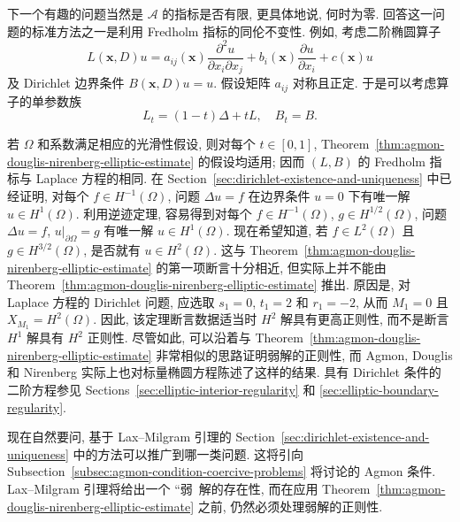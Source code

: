 下一个有趣的问题当然是 $\mathcal{A}$ 的指标是否有限, 更具体地说, 何时为零. 回答这一问题的标准方法之一是利用 Fredholm 指标的同伦不变性. 例如, 考虑二阶椭圆算子
\begin{equation}\label{eq:elliptic-dirichlet-index-homotopy-operator}
L(\bm{x},D)u=a_{ij}(\bm{x})\frac{\partial^2u}{\partial x_i\partial x_j}+b_i(\bm{x})\frac{\partial u}{\partial x_i}+c(\bm{x})u
\end{equation}
及 Dirichlet 边界条件 $B(\bm{x},D)u=u$. 假设矩阵 $a_{ij}$ 对称且正定. 于是可以考虑算子的单参数族
\begin{equation}\label{eq:elliptic-dirichlet-laplace-homotopy}
L_t=(1-t)\Delta+tL,\quad B_t=B.
\end{equation}


若 $\Omega$ 和系数满足相应的光滑性假设, 则对每个 $t\in[0,1]$, Theorem~\ref{thm:agmon-douglis-nirenberg-elliptic-estimate} 的假设均适用; 因而 $(L,B)$ 的 Fredholm 指标与 Laplace 方程的相同. 在 Section~\ref{sec:dirichlet-existence-and-uniqueness} 中已经证明, 对每个 $f\in H^{-1}(\Omega)$, 问题 $\Delta u=f$ 在边界条件 $u=0$ 下有唯一解 $u\in H^1(\Omega)$. 利用逆迹定理, 容易得到对每个 $f\in H^{-1}(\Omega)$, $g\in H^{1/2}(\Omega)$, 问题 $\Delta u=f$, $u|_{\partial\Omega}=g$ 有唯一解 $u\in H^1(\Omega)$. 现在希望知道, 若 $f\in L^2(\Omega)$ 且 $g\in H^{3/2}(\Omega)$, 是否就有 $u\in H^2(\Omega)$. 这与 Theorem~\ref{thm:agmon-douglis-nirenberg-elliptic-estimate} 的第一项断言十分相近, 但实际上并不能由 Theorem~\ref{thm:agmon-douglis-nirenberg-elliptic-estimate} 推出. 原因是, 对 Laplace 方程的 Dirichlet 问题, 应选取 $s_1=0$, $t_1=2$ 和 $r_1=-2$, 从而 $M_1=0$ 且 $X_{M_1}=H^2(\Omega)$. 因此, 该定理断言数据适当时 $H^2$ 解具有更高正则性, 而不是断言 $H^1$ 解具有 $H^2$ 正则性. 尽管如此, 可以沿着与 Theorem~\ref{thm:agmon-douglis-nirenberg-elliptic-estimate} 非常相似的思路证明弱解的正则性, 而 Agmon, Douglis 和 Nirenberg 实际上也对标量椭圆方程陈述了这样的结果. 具有 Dirichlet 条件的二阶方程参见 Sections~\ref{sec:elliptic-interior-regularity} 和 \ref{sec:elliptic-boundary-regularity}.

现在自然要问, 基于 Lax--Milgram 引理的 Section~\ref{sec:dirichlet-existence-and-uniqueness} 中的方法可以推广到哪一类问题. 这将引向 Subsection~\ref{subsec:agmon-condition-coercive-problems} 将讨论的 Agmon 条件. Lax--Milgram 引理将给出一个 ``弱\textquotesingle\textquotesingle\ 解的存在性, 而在应用 Theorem~\ref{thm:agmon-douglis-nirenberg-elliptic-estimate} 之前, 仍然必须处理弱解的正则性.

